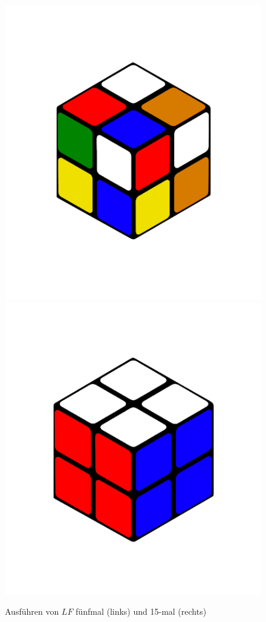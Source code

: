 \documentclass[12pt,a4paper, usenames, dvipsnames]{article}
\theoremstyle{mystyle}
\theoremstyle{definition}
\begin{document}
\begin{figure}[H]
\centering
\includegraphics[scale=0.12]{LLFF_5.png}
\includegraphics[scale=0.12]{2x2solved.png}
\caption{Ausführen von $LF$ fünfmal (links) und 15-mal (rechts)}
\label{Abbildung_LF_5_15}
\end{figure}
\end{document}
